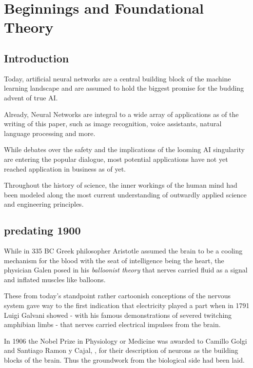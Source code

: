 \chapter{Beginnings and Foundational Theory}

\section{Introduction}

Today, artificial neural networks are a central building block of the machine learning landscape and are assumed to hold the biggest promise for the budding advent of true \ac{AI}. 

Already, Neural Networks are integral to a wide array of applications as of the writing of this paper, such as image recognition, voice assistants, natural language processing and more. 

While debates over the safety and the implications of the looming \ac{AI} singularity are entering the popular dialogue, most potential applications have not yet reached application in business as of yet.

Throughout the history of science, the inner workings of the human mind had been modeled along the most current understanding of outwardly applied science and engineering principles.

\pagebreak

\section{predating 1900}

While in 335 BC Greek philosopher Aristotle assumed the brain to be a cooling mechanism for the blood with the seat of intelligence being the heart, the physician Galen posed in his \textit{balloonist theory} that nerves carried fluid as a signal and inflated muscles like balloons.

These from today's standpoint rather cartoonish conceptions of the nervous system gave way to the first indication that electricity played a part when in 1791 Luigi Galvani showed - with his famous demonstrations of severed twitching amphibian limbs - that nerves carried electrical impulses from the brain. 

In 1906 the Nobel Prize in Physiology or Medicine was awarded to Camillo Golgi and Santiago Ramon y Cajal, \cite{golgi}, for their description of neurons as the building blocks of the brain. Thus the groundwork from the biological side had been laid.

